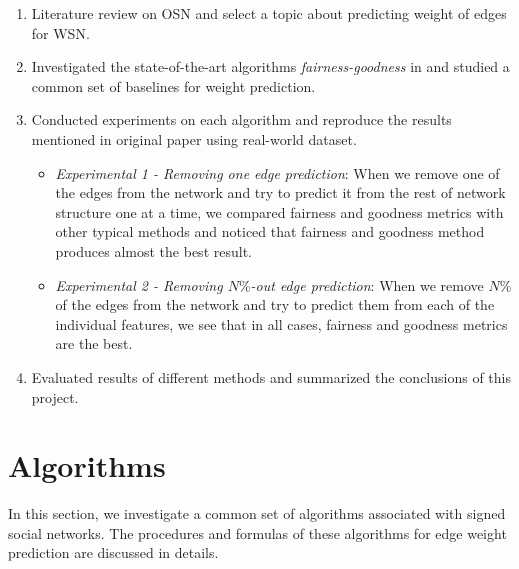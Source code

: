 \documentclass{article}
\begin{document}
\begin{enumerate}
	\item Literature review on OSN and select a topic about predicting weight of edges for WSN.
	
	\item Investigated the state-of-the-art algorithms \emph{fairness-goodness} in\cite{kumar2016edge} and  studied a common set of baselines for weight prediction.
	
	\item Conducted experiments on each algorithm and reproduce the results mentioned in original paper using real-world dataset.
  
  \begin{itemize}
    \item \emph{Experimental 1 -   Removing one edge prediction}: 
    When we remove one of the edges from the network and try to 
    predict it from the rest of network structure one at a time, 
    we compared fairness and goodness metrics with other typical 
    methods and noticed that fairness and goodness method produces 
    almost the best result. 
	
    \item \emph{Experimental 2 -  Removing $N \%$-out edge prediction}: 
    When we remove $N\%$ of the edges from the network and try to 
    predict them from each of the individual features, we see 
    that in all cases, fairness and goodness metrics are the best.
  \end{itemize}
  
  \item  Evaluated results of different methods and summarized the conclusions of this project.
	
\end{enumerate}

\section{Algorithms}
\label{sec4}
In this section, we investigate a common set of algorithms
associated with signed social networks. The procedures and
formulas of these algorithms for edge weight prediction are 
discussed in details. 








\end{document}

